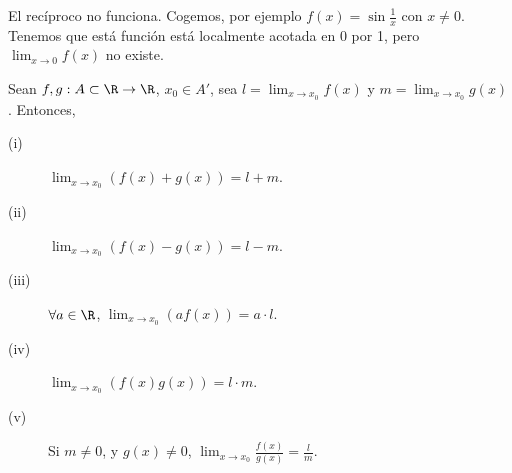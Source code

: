 \begin{eg}
\normalfont El recíproco no funciona. Cogemos, por ejemplo $\displaystyle f\left(x\right) = \sin \frac{1}{x} $ con $\displaystyle x \neq 0 $. Tenemos que está función está localmente acotada en $\displaystyle 0 $ por 1, pero $\displaystyle \lim_{x \to 0} f\left(x\right) $ no existe.  
\end{eg}

\begin{ftheorem}[]
	\normalfont Sean $\displaystyle f, g : A \subset \R \to \R $, $\displaystyle x_{0} \in A' $, sea $\displaystyle l = \lim_{x \to x_{0}}f\left(x\right)$ y $\displaystyle m = \lim_{x \to x_{0}}g\left(x\right) $. Entonces, 
\begin{description}
\item[(i)] $\displaystyle \lim_{x \to x_{0}}\left(f\left(x\right)+g\left(x\right)\right) = l+m $.
\item[(ii)] $\displaystyle \lim_{x \to x_{0}}\left(f\left(x\right)-g\left(x\right)\right) = l -m $.
\item[(iii)] $\displaystyle \forall a \in \R $, $\displaystyle \lim_{x \to x_{0}}\left(af\left(x\right)\right) = a \cdot l $.
\item[(iv)] $\displaystyle \lim_{x \to x_{0}}\left(f\left(x\right)g\left(x\right)\right) = l \cdot m$.
\item[(v)] Si $\displaystyle m \neq 0 $, y $\displaystyle g\left(x\right) \neq 0 $, $\displaystyle \lim_{x \to x_{0}}\frac{f\left(x\right)}{g\left(x\right)} = \frac{l}{m} $.
\end{description}
\end{ftheorem}

